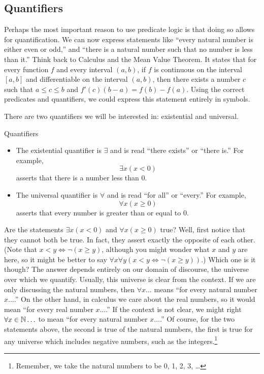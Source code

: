 \documentclass[12pt]{article}
\begin{document}
\subsection{Quantifiers}

Perhaps the most important reason to use predicate logic is that doing so allows for quantification.  We can now express statements like ``every natural number is either even or odd,'' and ``there is a natural number such that no number is less than it.''  Think back to Calculus and the Mean Value Theorem.  It states that for every function $f$ and every interval $(a, b)$, if $f$ is continuous on the interval $[a,b]$ and differentiable on the interval $(a,b)$, then there exists a number $c$ such that $a \le c \le b$ and $f'(c)(b - a) = f(b) - f(a)$.  Using the correct predicates and quantifiers, we could express this statement entirely in symbols.

There are two quantifiers we will be interested in: existential and universal.

\begin{defbox}{Quantifiers}
  \begin{itemize}
    \item The existential quantifier is $\exists$ and is read ``there exists'' or ``there is.''  For example,
\[\exists x (x < 0)\]
asserts that there is a number less than 0.
\item The universal quantifier is $\forall$ and is read ``for all'' or ``every.''  For example,
\[\forall x (x \ge 0)\]
asserts that every number is greater than or equal to 0.
  \end{itemize}
\end{defbox}

  Are the statements $\exists x (x < 0)$ and $\forall x (x \ge 0)$ true?  Well, first notice that they cannot both be true.  In fact, they assert exactly the opposite of each other.  (Note that $x < y \iff \neg(x \ge y)$, although you might wonder what $x$ and $y$ are here, so it might be better to say $\forall x \forall y\left(x < y \iff \neg(x \ge y)\right)$.)  Which one is it though?  The answer depends entirely on our domain of discourse, the universe over which we quantify.  Usually, this universe is clear from the context.  If we are only discussing the natural numbers, then $\forall x \ldots$ means ``for every natural number $x \ldots$.''  On the other hand, in calculus we care about the real numbers, so it would mean ``for every real number $x \ldots$.''  If the context is not clear, we might right $\forall x \in \mathbb N\ldots$ to mean ``for every natural number $x\ldots$.''  Of course, for the two statements above, the second is true of the natural numbers, the first is true for any universe which includes negative numbers, such as the integers.\footnote{Remember, we take the natural
numbers to be 0, 1, 2, 3, \ldots}
\end{document}
